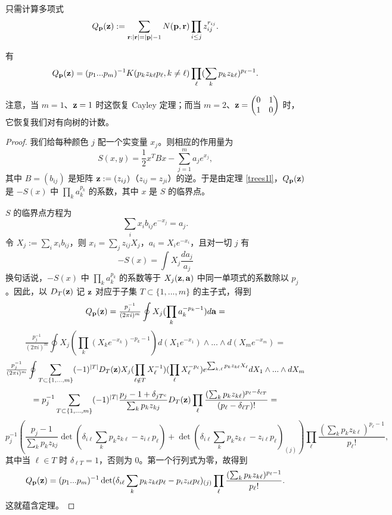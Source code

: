 只需计算多项式
$$
Q_{\bold p}(\bold z):=\sum_{\bold r: |\bold r|=|\bold p|-1} N(\bold p,\bold r)\prod_{i\le j}z_{ij}^{r_{ij}}. 
$$
\begin{theorem}\label{mt} 有
$$
Q_\bold p(\bold z)=
(p_1...p_m)^{-1}K(p_kz_{k\ell}p_\ell, k\ne \ell)\prod_\ell(\sum_k p_kz_{k\ell})^{p_\ell-1}.
$$
\end{theorem}

注意，当 $m=1$、$\bold z=1$ 时这恢复 Cayley 定理；而当 $m=2$、$\bold z=\begin{pmatrix} 0& 1\\ 1& 0\end{pmatrix}$ 时，它恢复我们对有向树的计数。

\begin{proof}
我们给每种颜色 $j$ 配一个实变量 $x_j$。则相应的作用量为
$$
S(x,y)=\frac{1}{2}x^TB x-\sum_{j=1}^m a_je^{x_j},
$$
其中 $B=(b_{ij})$ 是矩阵 $\bold z:=(z_{ij})$（$z_{ij}=z_{ji}$）的逆。于是由定理 \ref{trees1l}，$Q_{\bold p}(\bold z)$ 是 $-S(x)$ 中 $\prod_k a_k^{p_k}$ 的系数，其中 $x$ 是 $S$ 的临界点。

$S$ 的临界点方程为
$$
\sum_i x_ib_{ij}e^{-x_j}=a_j.
$$
令 $X_j:=\sum_i x_ib_{ij}$，则 $x_i=\sum_jz_{ij}X_j$，$a_i=X_ie^{-x_i}$，且对一切 $j$ 有
$$
-S(x)=\int X_j\frac{da_j}{a_j}
$$
换句话说，$-S(x)$ 中 $\prod_k a_k^{p_k}$ 的系数等于 $X_j(\bold z,\bold a)$ 中同一单项式的系数除以 $p_j$。因此，以 $D_T(\bold z)$ 记 $\bold z$ 对应于子集 $T\subset \lbrace 1,...,m\rbrace$ 的主子式，得到
$$
Q_{\bold p}(\bold z)=\tfrac{p_j^{-1}}{(2\pi i)^m}\oint X_j(\prod_k a_k^{-p_k-1})d\bold a=
$$
$$
\tfrac{p_j^{-1}}{(2\pi i)^m}\oint X_j(\prod_k (X_ke^{-x_k})^{-p_k-1})d(X_1e^{-x_1})\wedge...\wedge d(X_me^{-x_m})=
$$
$$
\tfrac{p_j^{-1}}{(2\pi i)^m}\oint \sum_{T\subset \lbrace 1,...,m\rbrace}(-1)^{|T|}D_T(\bold z)X_j(\prod_{\ell\notin T}X_\ell^{-1})(\prod_\ell X_\ell^{-p_\ell})e^{\sum_{k,\ell} p_kz_{k\ell}X_\ell}dX_1\wedge...\wedge dX_m
$$
$$
=p_j^{-1}\sum_{T\subset \lbrace 1,...,m\rbrace}(-1)^{|T|}\frac{p_j-1+\delta_{jT^c}}{\sum_k p_kz_{kj}}D_T(\bold z)\prod_\ell\frac{(\sum_k p_kz_{k\ell})^{p_\ell-\delta_{\ell T}}}{(p_\ell-\delta_{\ell T})!}=
$$
\scriptsize
$$
p_j^{-1}
\left(\frac{p_j-1}{\sum_k p_kz_{kj}}\det(\delta_{i\ell}\sum_k p_kz_{k\ell}-z_{i\ell}p_\ell)+
\det(\delta_{i\ell}\sum_k p_kz_{k\ell}-z_{i\ell}p_\ell)_{(j)}\right)\prod_\ell\frac{(\sum_k p_kz_{k\ell})^{p_\ell-1}}{p_\ell!},
$$
\normalsize
其中当 $\ell\in T$ 时 $\delta_{\ell T}=1$，否则为 $0$。第一个行列式为零，故得到
$$
Q_{\bold p}(\bold z)=(p_1...p_m)^{-1}\det(\delta_{i\ell}\sum_k p_kz_{k\ell}p_\ell-p_iz_{i\ell}p_\ell)_{(j)}\prod_\ell\frac{(\sum_k p_kz_{k\ell})^{p_\ell-1}}{p_\ell!}.
$$
这就蕴含定理。
\end{proof}

